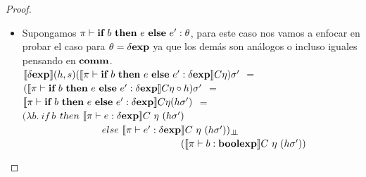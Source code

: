 \begin{proof}
\begin{itemize}
\begin{itemize}
$\semBrcks{\boolexp}(h,s)(\semBrcks{\pi \vdash \neg e : \boolexp}C\eta)\sigma'$ $=$\\
$\semBrcks{\boolexp}(h,s)(\lambda \sigma . \ 
 \neg_{\odot}(\semBrcks{\pi \vdash e : \boolexp}C\eta\sigma))\sigma'$ $=$\\
$((\lambda \sigma . \ \neg_{\odot}(\semBrcks{\pi \vdash e : \boolexp}C\eta\sigma))
	\circ 
	h) \sigma'$ $=$ \\
$\neg_{\odot}(\semBrcks{\pi \vdash e : \boolexp}C\eta(h\sigma'))$ $=$\\
$\neg_{\odot}
	((\semBrcks{\pi \vdash e : \boolexp}C\eta \circ h)\sigma'))$ $=$\\
$\neg_{\odot}
	(\semBrcks{\boolexp}(h,s)(\semBrcks{\pi \vdash e : \boolexp}C\eta)\sigma')$\\
	
hasta ac\'a ha sido simplemente reescribir usando definiciones, de esta manera llegamos
a poder aplicar la hip\'otesis inductiva,\\

$\neg_{\odot}
	(\semBrcks{\boolexp}(h,s)(\semBrcks{\pi \vdash e : \boolexp}C\eta)\sigma')$\\
$\neg_{\odot}
	(\semBrcks{\pi \vdash e : \boolexp}C(\semBrcks{\pi}(h,s)\eta)\sigma')$ $=$\\
$\semBrcks{\pi \vdash \neg e : \boolexp}C(\semBrcks{\pi}(h,s)\eta)\sigma'$

\item Supongamos $\pi \vdash \textbf{if} \ b \ \textbf{then} \ e \ \textbf{else} \ e' : \theta$, para este caso
nos vamos a enfocar en probar el caso para $\theta = \delta \textbf{exp}$ ya que los dem\'as
son an\'alogos o incluso iguales pensando en $\textbf{comm}$.\\

$\llbracket \delta \textbf{exp} \rrbracket(h,s)
	(\llbracket \pi \vdash \textbf{if} \ b \ \textbf{then} \ e \ \textbf{else} \ e' : \delta \textbf{exp} \rrbracket C\eta)\sigma'$ $=$\\
$(\llbracket \pi \vdash \textbf{if} \ b \ \textbf{then} \ e \ \textbf{else} \ e' : \delta \textbf{exp} \rrbracket C\eta \circ h)\sigma'$ $=$\\
$\llbracket \pi \vdash \textbf{if} \ b \ \textbf{then} \ e \ \textbf{else} \ e' : \delta \textbf{exp} \rrbracket C\eta (h\sigma')$ $=$\\
$(\lambda b . \ if \ b $ $then \ \llbracket  \pi \vdash e : \delta \textbf{exp} \rrbracket C \ \eta \ (h\sigma')$\\
\indent \ \ \ \ \ \ \ \ \ \ \ \ \ \ \ \ 
$else \ \llbracket  \pi \vdash e' : \delta \textbf{exp} \rrbracket C \ \eta \ (h\sigma'))_{\bot \!\!\! \bot}$ \\
\indent \ \ \ \ \ \ \ \ \ \ \ \ \ \ \ \ \ \ \ \ \ \ \ \ \ \ \ \ \ \ \ \
$(\llbracket  \pi \vdash b : \textbf{boolexp} \rrbracket C \ \eta \ (h\sigma'))$\\


\end{itemize}
\end{itemize}
\end{proof}
